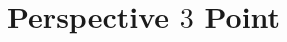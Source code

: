 \documentclass[a4paper]{article}
\begin{document}
\section{Perspective $3$ Point}

%

%
%



 
 

\end{document}
